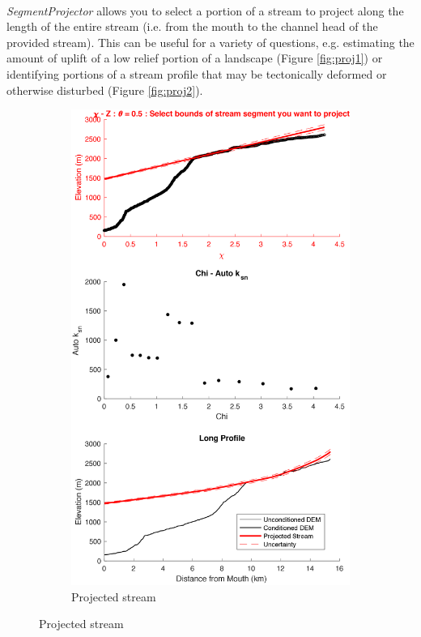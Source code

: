 \paragraph{}\textit{SegmentProjector} allows you to select a portion of a stream to project along the length of the entire stream (i.e. from the mouth to the channel head of the provided stream). This can be useful for a variety of questions, e.g. estimating the amount of uplift of a low relief portion of a landscape (Figure \ref{fig:proj1}) or identifying portions of a stream profile that may be tectonically deformed or otherwise disturbed (Figure \ref{fig:proj2}).

\begin{figure}[H]
	\centering
	\begin{subfigure}{.5\textwidth}
		\centering
		\includegraphics[width=.8\linewidth]{PNGs/B402_ProjectedProfile_1.png}
		\caption{Projected stream}
		\label{fig:p1sub1}
	\end{subfigure}%

\end{figure}
